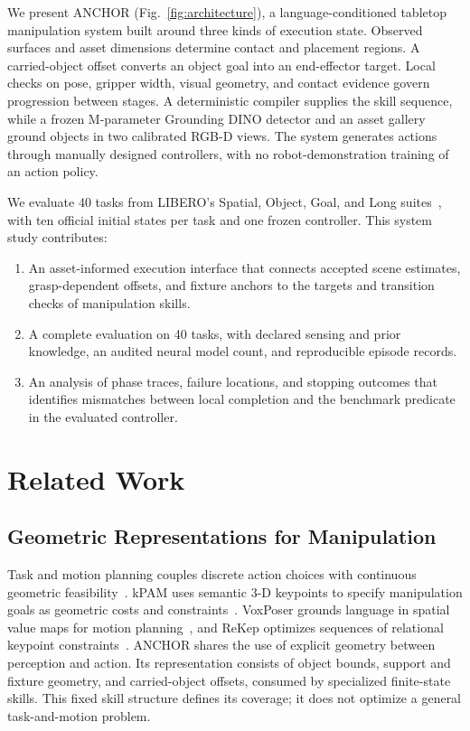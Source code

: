\documentclass[letterpaper,10pt,conference]{ieeeconf}
\newcommand{\method}{ANCHOR}
\begin{document}
We present \method{} (Fig.~\ref{fig:architecture}), a language-conditioned
tabletop manipulation system built around three kinds of execution state.
Observed surfaces and asset dimensions determine contact and placement
regions. A carried-object offset converts an object goal into an end-effector
target. Local checks on pose, gripper width, visual geometry, and contact
evidence govern progression between stages. A deterministic compiler supplies
the skill sequence, while a frozen \NeuralMillion{}M-parameter Grounding DINO
detector and an asset gallery ground objects in two calibrated RGB-D views.
The system generates actions through manually designed controllers, with no
robot-demonstration training of an action policy.

We evaluate 40 tasks from LIBERO's Spatial, Object, Goal, and Long
suites~\cite{libero}, with ten official initial states per task and one frozen
controller. This system study contributes:

\begin{enumerate}
\item An asset-informed execution interface that connects accepted scene
      estimates, grasp-dependent offsets, and fixture anchors to the targets
      and transition checks of manipulation skills.
\item A complete evaluation on 40 tasks, with declared sensing and prior
      knowledge, an audited neural model count, and reproducible episode records.
\item An analysis of phase traces, failure locations, and stopping outcomes
      that identifies mismatches between local completion and the benchmark
      predicate in the evaluated controller.
\end{enumerate}

\section{Related Work}
\subsection{Geometric Representations for Manipulation}
Task and motion planning couples discrete action choices with continuous
geometric feasibility~\cite{tamp}. kPAM uses
semantic 3-D keypoints to specify manipulation goals as geometric costs and
constraints~\cite{kpam}. VoxPoser grounds language in spatial value maps for
motion planning~\cite{voxposer}, and ReKep optimizes sequences of relational
keypoint constraints~\cite{rekep}. \method{} shares the use of explicit geometry
between perception and action. Its representation consists of object bounds,
support and fixture geometry, and carried-object offsets, consumed by
specialized finite-state skills. This fixed skill structure defines its
coverage; it does not optimize a general task-and-motion problem.
\end{document}
